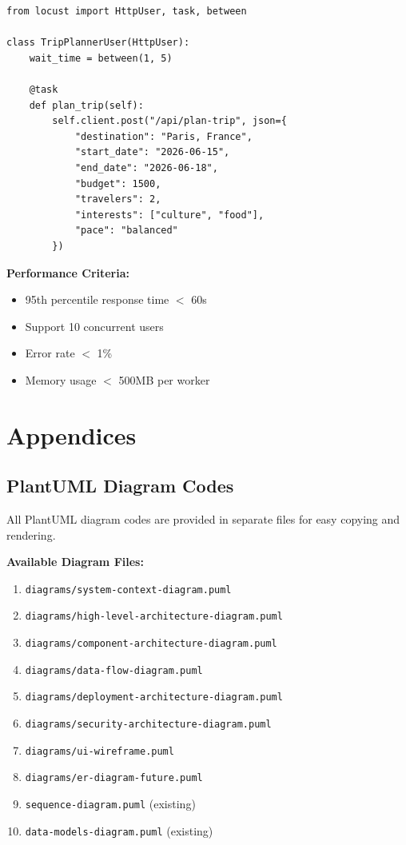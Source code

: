 \documentclass[12pt,a4paper]{report}
\begin{document}
\begin{lstlisting}[style=pythonstyle, caption={Load Test with Locust}]
from locust import HttpUser, task, between

class TripPlannerUser(HttpUser):
    wait_time = between(1, 5)
    
    @task
    def plan_trip(self):
        self.client.post("/api/plan-trip", json={
            "destination": "Paris, France",
            "start_date": "2026-06-15",
            "end_date": "2026-06-18",
            "budget": 1500,
            "travelers": 2,
            "interests": ["culture", "food"],
            "pace": "balanced"
        })
\end{lstlisting}

\textbf{Performance Criteria:}
\begin{itemize}
    \item 95th percentile response time $<$ 60s
    \item Support 10 concurrent users
    \item Error rate $<$ 1\%
    \item Memory usage $<$ 500MB per worker
\end{itemize}

\chapter{Appendices}

\section{PlantUML Diagram Codes}

All PlantUML diagram codes are provided in separate files for easy copying and rendering.

\textbf{Available Diagram Files:}
\begin{enumerate}
    \item \texttt{diagrams/system-context-diagram.puml}
    \item \texttt{diagrams/high-level-architecture-diagram.puml}
    \item \texttt{diagrams/component-architecture-diagram.puml}
    \item \texttt{diagrams/data-flow-diagram.puml}
    \item \texttt{diagrams/deployment-architecture-diagram.puml}
    \item \texttt{diagrams/security-architecture-diagram.puml}
    \item \texttt{diagrams/ui-wireframe.puml}
    \item \texttt{diagrams/er-diagram-future.puml}
    \item \texttt{sequence-diagram.puml} (existing)
    \item \texttt{data-models-diagram.puml} (existing)
\end{enumerate}
\end{document}
